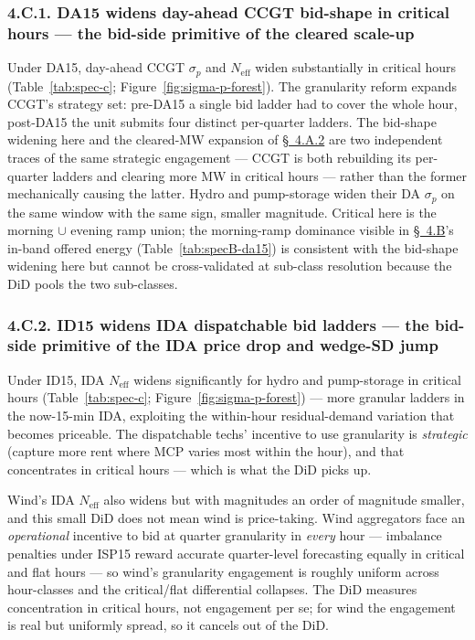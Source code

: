 \documentclass[11pt]{article}
\begin{document}
\subsubsection*{4.C.1. DA15 widens day-ahead CCGT bid-shape in critical hours --- the bid-side primitive of the cleared scale-up}\label{sec:4i}
Under DA15, day-ahead CCGT $\sigma_p$ and $N_{\text{eff}}$ widen substantially in critical hours (Table~\ref{tab:spec-c}; Figure~\ref{fig:sigma-p-forest}). The granularity reform expands CCGT's strategy set: pre-DA15 a single bid ladder had to cover the whole hour, post-DA15 the unit submits four distinct per-quarter ladders. The bid-shape widening here and the cleared-MW expansion of \hyperref[sec:4iii]{\S~4.A.2} are two independent traces of the same strategic engagement --- CCGT is both rebuilding its per-quarter ladders and clearing more MW in critical hours --- rather than the former mechanically causing the latter. Hydro and pump-storage widen their DA $\sigma_p$ on the same window with the same sign, smaller magnitude. Critical here is the morning $\cup$ evening ramp union; the morning-ramp dominance visible in \hyperref[sec:4-specB]{\S~4.B}'s in-band offered energy (Table~\ref{tab:specB-da15}) is consistent with the bid-shape widening here but cannot be cross-validated at sub-class resolution because the DiD pools the two sub-classes.

\subsubsection*{4.C.2. ID15 widens IDA dispatchable bid ladders --- the bid-side primitive of the IDA price drop and wedge-SD jump}\label{sec:4-c-id15-ida}
Under ID15, IDA $N_{\text{eff}}$ widens significantly for hydro and pump-storage in critical hours (Table~\ref{tab:spec-c}; Figure~\ref{fig:sigma-p-forest}) --- more granular ladders in the now-15-min IDA, exploiting the within-hour residual-demand variation that becomes priceable. The dispatchable techs' incentive to use granularity is \emph{strategic} (capture more rent where MCP varies most within the hour), and that concentrates in critical hours --- which is what the DiD picks up.

Wind's IDA $N_{\text{eff}}$ also widens but with magnitudes an order of magnitude smaller, and this small DiD does not mean wind is price-taking. Wind aggregators face an \emph{operational} incentive to bid at quarter granularity in \emph{every} hour --- imbalance penalties under ISP15 reward accurate quarter-level forecasting equally in critical and flat hours --- so wind's granularity engagement is roughly uniform across hour-classes and the critical/flat differential collapses. The DiD measures concentration in critical hours, not engagement per se; for wind the engagement is real but uniformly spread, so it cancels out of the DiD.
\end{document}
